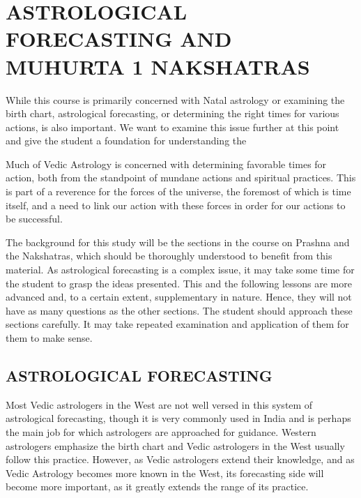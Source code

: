 \section{ASTROLOGICAL FORECASTING AND MUHURTA 1
NAKSHATRAS}
 

While this course is primarily concerned with Natal astrology or examining the birth chart, astrological forecasting, or determining the right times for various actions, is also important. We want to examine this issue further at this point and give the student a foundation for understanding the

 

Much of Vedic Astrology is concerned with determining favorable times for action, both from the standpoint of mundane actions and spiritual practices. This is part of a reverence for the forces of the universe, the foremost of which is time itself, and a need to link our action with these forces in order for our actions to be successful.

 

The background for this study will be the sections in the course on Prashna and the Nakshatras, which should be thoroughly understood to benefit from this material. As astrological forecasting is a complex issue, it may take some time for the student to grasp the ideas presented. This and the following lessons are more advanced and, to a certain extent, supplementary in nature. Hence, they will not have as many questions as the other sections. The student should approach these sections carefully. It may take repeated examination and application of them for them to make sense.



 

 

\subsection{ASTROLOGICAL FORECASTING}

 

Most Vedic astrologers in the West are not well versed in this system of astrological forecasting, though it is very commonly used in India and is perhaps the main job for which astrologers are approached for guidance. Western astrologers emphasize the birth chart and Vedic astrologers in the West usually follow this practice. However, as Vedic astrologers extend their knowledge, and as Vedic Astrology becomes more known in the West, its forecasting side will become more important, as it greatly extends the range of its practice.

